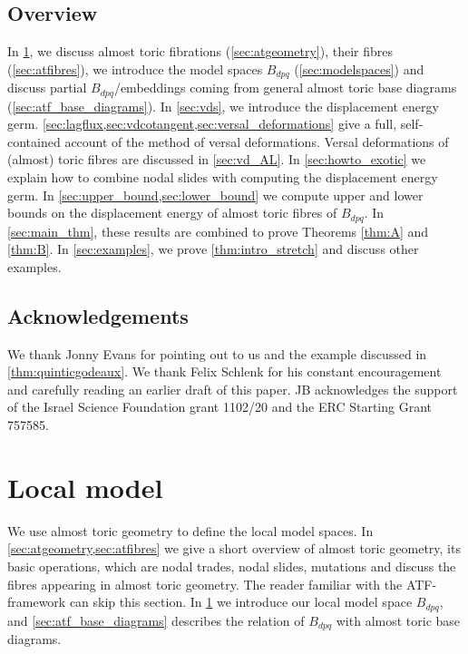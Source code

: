 \documentclass[AIF,Unicode,manuscript]{cedram}
\begin{document}
\subsection{Overview}

In \cref{sec:local_model}, we discuss almost toric fibrations (\cref{sec:atgeometry}), their fibres (\cref{sec:atfibres}), we introduce the model spaces $B_{dpq}$ (\cref{sec:modelspaces}) and discuss partial $B_{dpq}$\-/embeddings coming from general almost toric base diagrams (\cref{sec:atf_base_diagrams}).
In \cref{sec:vds}, we introduce the displacement energy germ.
\cref{sec:lagflux,sec:vdcotangent,sec:versal_deformations} give a full, self-contained account of the method of versal deformations.
Versal deformations of (almost) toric fibres are discussed in \cref{sec:vd_AL}. In \cref{sec:howto_exotic} we explain how to combine nodal slides with computing the displacement energy germ.
In \cref{sec:upper_bound,sec:lower_bound} we compute upper and lower bounds on the displacement energy of almost toric fibres of $B_{dpq}$.
In \cref{sec:main_thm}, these results are combined to prove Theorems \ref{thm:A} and \ref{thm:B}.
In \cref{sec:examples}, we prove \cref{thm:intro_stretch} and discuss other examples.

\subsection{Acknowledgements}
We thank Jonny Evans for pointing out to us \cite{EvaUrz21} and the example discussed in \cref{thm:quinticgodeaux}.
We thank Felix Schlenk for his constant encouragement and carefully reading an earlier draft of this paper.
JB acknowledges the support of the Israel Science Foundation grant 1102/20 and the ERC Starting Grant 757585.

\section{Local model}
\label{sec:local_model}

We use almost toric geometry to define the local model spaces.
In \cref{sec:atgeometry,sec:atfibres} we give a short overview of almost toric geometry, its basic operations, which are nodal trades, nodal slides, mutations and discuss the fibres appearing in almost toric geometry.
The reader familiar with the ATF-framework can skip this section.
In \cref{sec:local_model} we introduce our local model space $B_{dpq}$, and \cref{sec:atf_base_diagrams} describes the relation of $B_{dpq}$ with almost toric base diagrams.
\end{document}
